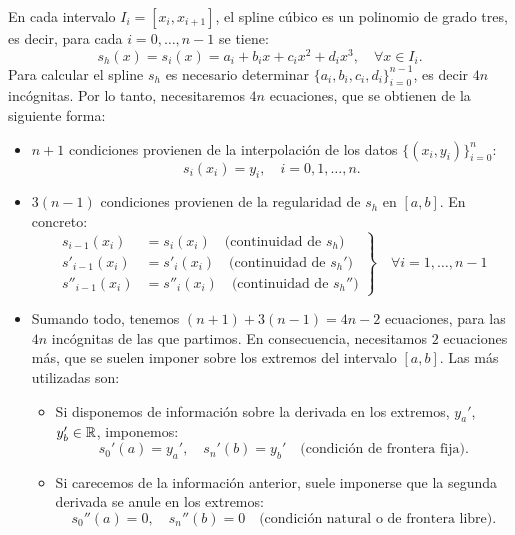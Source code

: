  En cada intervalo $I_i=[x_i, x_{i+1}]$, el spline cúbico es un
 polinomio de grado tres, es decir, para cada $i=0,\dots,n-1$ se tiene:
 \begin{equation}
   s_h(x) = s_i(x) = a_i + b_ix + c_ix^2 + d_ix^3,\quad
   \forall x\in I_i.
   \label{eq:spline-cubico}
 \end{equation}
 Para calcular el spline $s_h$ es necesario determinar $\{a_i, b_i,
 c_i, d_i\}_{i=0}^{n-1}$, es decir $4n$ incógnitas. Por lo tanto,
 necesitaremos $4n$ ecuaciones, que se obtienen de la siguiente forma:
 \begin{itemize}
 \item $n+1$ condiciones provienen de la interpolación de los datos
   $\{(x_i, y_i)\}_{i=0}^n$:
   $$
   s_i(x_i)=y_i, \quad i=0,1,\dots,n.
   $$
 \item $3(n-1)$ condiciones provienen  de la regularidad de $s_h$ en
   $[a,b]$. En concreto:
   \begin{equation*}
     \left.
       \begin{aligned}
         s_{i-1}(x_i)&=s_{i}(x_i) \quad \text{(continuidad de $s_h$)}
         \\
         s'_{i-1}(x_i)&=s'_{i}(x_i) \quad \text{(continuidad de $s_h'$)}
         \\
         s''_{i-1}(x_i)&=s''_{i}(x_i) \quad \text{(continuidad de $s_h''$)}
       \end{aligned}
     \right\} \quad \forall i=1,\dots,n-1 
   \end{equation*}
 \item Sumando todo, tenemos $(n+1) + 3(n-1) = 4n-2$ ecuaciones, para
   las $4n$ incógnitas de las que partimos. En consecuencia,
   necesitamos $2$ ecuaciones más, que se suelen imponer sobre los
   extremos del intervalo $[a,b]$. Las más utilizadas son:
   \begin{itemize}
   \item Si disponemos de información sobre la derivada en los
     extremos, $y_a'$, $y_b'\in\operatorname{{\mathbb R}}$, imponemos:
     \begin{equation*}
       s_0'(a)=y_a', \quad s_n'(b)=y_b' \quad \text{(condición de frontera fija)}.
     \end{equation*}
   \item Si carecemos de la información anterior, suele imponerse que
     la segunda derivada se anule en los extremos:
     \begin{equation*}
       s_0''(a)=0, \quad s_n''(b)=0 \quad \text{(condición natural o de
         frontera libre)}.
     \end{equation*}
   \end{itemize}
 \end{itemize}

